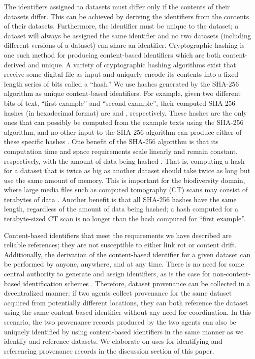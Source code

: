 The identifiers assigned to datasets must differ only if the contents of their datasets differ. This can be achieved by deriving the identifiers from the contents of their datasets. Furthermore, the identifier must be unique to the dataset; a dataset will always be assigned the same identifier and no two datasets (including different versions of a dataset) can share an identifier. Cryptographic hashing is one such method for producing content-based identifiers which are both content-derived and unique. A variety of cryptographic hashing algorithms exist that receive some digital file as input and uniquely encode its contents into a fixed-length series of bits called a ``hash.'' We use hashes generated by the SHA-256 algorithm  as unique content-based identifiers. For example, given two different bits of text, ``first example'' and ``second example'', their computed SHA-256 hashes (in hexadecimal format) are  and , respectively. These hashes are the only ones that can possibly be computed from the example texts using the SHA-256 algorithm, and no other input to the SHA-256 algorithm can produce either of these specific hashes . One benefit of the SHA-256 algorithm is that its computation time and space requirements scale linearly and remain constant, respectively, with the amount of data being hashed . That is, computing a hash for a dataset that is twice as big as another dataset should take twice as long but use the same amount of memory. This is important for the biodiversity domain, where large media files such as computed tomography (CT) scans may consist of terabytes of data \citep{EJT693}. Another benefit is that all SHA-256 hashes have the same length, regardless of the amount of data being hashed; a hash computed for a terabyte-sized CT scan is no longer than the hash computed for ``first example''.

Content-based identifiers that meet the requirements we have described are reliable references; they are not susceptible to either link rot or content drift. Additionally, the derivation of the content-based identifier for a given dataset can be performed by anyone, anywhere, and at any time. There is no need for some central authority to generate and assign identifiers, as is the case for non-content-based identification schemes \citep{Paskin_1999}. Therefore, dataset provenance can be collected in a decentralized manner; if two agents collect provenance for the same dataset acquired from potentially different locations, they can both reference the dataset using the same content-based identifier without any need for coordination. In this scenario, the two provenance records produced by the two agents can also be uniquely identified by using content-based identifiers in the same manner as we identify and reference datasets. We elaborate on uses for identifying and referencing provenance records in the discussion section of this paper.


